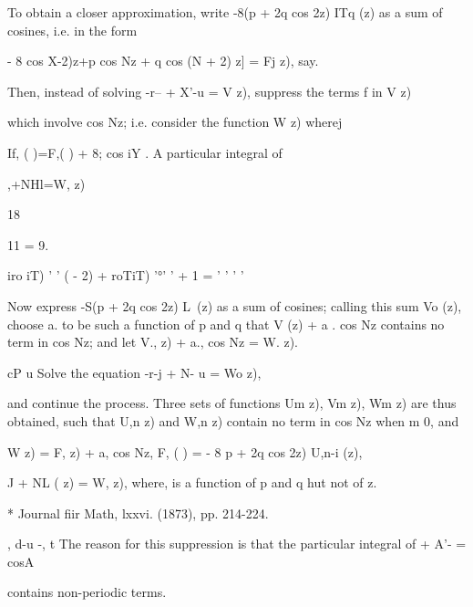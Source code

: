 To obtain a closer approximation, write -8(p + 2q cos 2z) ITq (z) as a
sum of cosines, i.e. in the form

- 8 cos X-2)z+p cos Nz + q cos (N + 2) z] = Fj z), say.

Then, instead of solving -r-- + X'-u = V z), suppress the terms f in V
z)

which involve cos Nz; i.e. consider the function W z) wherej

If, ( )=F,( ) + 8; cos iY . A particular integral of

,+NHl=W, z)

18

11 = 9.

iro iT) ' ' ( - 2) + roTiT) '°' ' + 1 = ' ' ' ' 

Now express -S(p + 2q cos 2z) L\ (z) as a sum of cosines; calling
this sum Vo (z), choose a. to be such a function of p and q that V (z)
+ a . cos Nz contains no term in cos Nz; and let V., z) + a., cos Nz
= W. z).

cP u Solve the equation -r-j + N- u = Wo z),

and continue the process. Three sets of functions Um z), Vm z), Wm z)
are thus obtained, such that U,n z) and W,n z) contain no term in cos
Nz when m 0, and

W z) = F, z) + a, cos Nz, F, ( ) = - 8 p + 2q cos 2z) U,n-i (z),

 J + NL ( z) = W, z), where, is a function of p and q hut not of z.

* Journal fiir Math, lxxvi. (1873), pp. 214-224.

, d-u -, t The reason for this suppression is that the particular
integral of + A'- = cosA

contains non-periodic terms.

